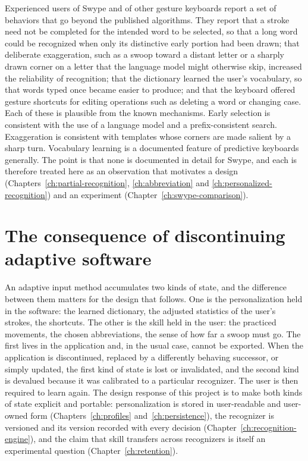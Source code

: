 Experienced users of Swype and of other gesture keyboards report a set of behaviors that go beyond the published algorithms. They report that a stroke need not be completed for the intended word to be selected, so that a long word could be recognized when only its distinctive early portion had been drawn; that deliberate exaggeration, such as a swoop toward a distant letter or a sharply drawn corner on a letter that the language model might otherwise skip, increased the reliability of recognition; that the dictionary learned the user's vocabulary, so that words typed once became easier to produce; and that the keyboard offered gesture shortcuts for editing operations such as deleting a word or changing case.\evO{} Each of these is plausible from the known mechanisms. Early selection is consistent with the use of a language model and a prefix-consistent search. Exaggeration is consistent with templates whose corners are made salient by a sharp turn. Vocabulary learning is a documented feature of predictive keyboards generally. The point is that none is documented in detail for Swype, and each is therefore treated here as an observation that motivates a design (Chapters~\ref{ch:partial-recognition}, \ref{ch:abbreviation} and \ref{ch:personalized-recognition}) and an experiment (Chapter~\ref{ch:swype-comparison}).

\section{The consequence of discontinuing adaptive software}

An adaptive input method accumulates two kinds of state, and the difference between them matters for the design that follows. One is the personalization held in the software: the learned dictionary, the adjusted statistics of the user's strokes, the shortcuts. The other is the skill held in the user: the practiced movements, the chosen abbreviations, the sense of how far a swoop must go. The first lives in the application and, in the usual case, cannot be exported. When the application is discontinued, replaced by a differently behaving successor, or simply updated, the first kind of state is lost or invalidated, and the second kind is devalued because it was calibrated to a particular recognizer. The user is then required to learn again. The design response of this project is to make both kinds of state explicit and portable: personalization is stored in user-readable and user-owned form (Chapters~\ref{ch:profiles} and~\ref{ch:persistence}), the recognizer is versioned and its version recorded with every decision (Chapter~\ref{ch:recognition-engine}), and the claim that skill transfers across recognizers is itself an experimental question (Chapter~\ref{ch:retention}).

